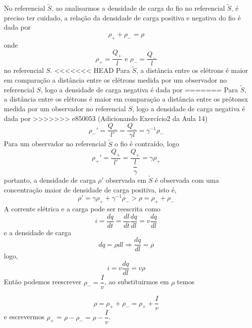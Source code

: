 \documentclass[10pt,a4paper]{article}
\begin{document}
\begin{enumerate}
\begin{enumerate}
		No referencial $\tilde{S}$,
		ao analisarmos a densidade de carga do fio no referencial $\tilde{S}$, é preciso ter cuidado, a relação da densidade de carga positiva e negativa do fio é dada por
		\begin{equation*}
			\rho_+ +\rho_- = \rho
		\end{equation*}
		onde
		\begin{equation*}
			\rho_+ = \frac{Q_+}{l}\text{ e  } \rho_- = \frac{Q_-}{l}
		\end{equation*}
		no referencial $ S $.
<<<<<<< HEAD
		Para $\tilde{S}$, a distância entre os elétrons é maior em comparação a distância entre os elétrons medida por um observador no referencial $ S $, logo a densidade de carga negativa é dada por
=======
		Para $\tilde{S}$, a distância entre os elétrons é maior em comparação a distância entre os prótonsx medida por um observador no referencial $ S $, logo a densidade de carga negativa é dada por
>>>>>>> e850053 (Adicionando Exercício2 da Aula 14)
		\begin{equation*}
			\rho_-'  = \dfrac{Q_-}{l'}=\dfrac{Q_-}{\gamma l} = \gamma^{-1} \rho_-
		\end{equation*}
		Para um observador no referencial $\tilde{S}$ o fio é contraído, logo
		\begin{equation*}
			\rho_+\prime = \dfrac{Q_+}{l\prime} = \dfrac{Q_+}{\dfrac{l}{\gamma}} = \gamma\rho_+
		\end{equation*}
		portanto, a densidade de carga $\rho\prime$ observada em $\tilde{S}$ é observada com uma concentração maior de densidade de carga positiva, isto é,
		\begin{equation*}
			\rho\prime = \gamma\rho_+ + \gamma^{-1}\rho_- > \rho = \rho_+ + \rho_-
		\end{equation*}
		A corrente elétrica e a carga pode ser reescrita como 
		\begin{equation*}
			i = \dfrac{dq}{dt} = \dfrac{dl}{dt}\dfrac{dq}{dl} = v \dfrac{dq}{dl}
		\end{equation*}
		e a densidade de carga
		\begin{equation*}
			dq = \rho dl \Rightarrow \dfrac{dq}{dl} = \rho
		\end{equation*}
		logo,
		\begin{equation*}
			i = v\dfrac{dq}{dl} = v\rho
		\end{equation*}	
		Então podemos reescrever $\rho_- = \dfrac{I}{v}$, ao substituirmos em $\rho$ temos
		
		\begin{equation*}
			\rho = \rho_++\rho_- = \rho_+ + \dfrac{I}{v}
		\end{equation*}
		e escrevermos $\rho_+$ = $\rho - \rho_- = \rho - \dfrac{I}{v}$.
		

\end{enumerate}
\end{enumerate}
\end{document}
